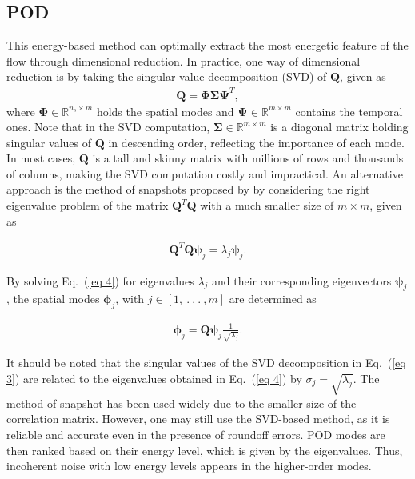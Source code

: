 \documentclass[a4paper,fleqn]{cas-sc}
\begin{document}
	\subsection{POD}
	\label{POD}
	
	This energy-based method can optimally extract the most energetic feature of the flow through dimensional reduction. In practice, one way of dimensional reduction is by taking the singular value decomposition (SVD) of $\mathbf{Q}$, given as
	\begin{align}
		\mathbf{Q} = \mathbf{\Phi} \mathbf{\Sigma} \mathbf{\Psi}^T ,\label{eq 3}
	\end{align}
	\noindent where $\mathbf{\Phi} \in \mathbb{R}^{n_s\times m}$ holds the spatial modes and $\mathbf{\Psi}\in \mathbb{R}^{m\times m}$ contains the temporal ones. Note that in the SVD computation, $\mathbf{\Sigma}\in \mathbb{R}^{m\times m}$ is a diagonal matrix holding singular values of $\mathbf{Q}$ in descending order, reflecting the importance of each mode. In most cases, $\mathbf{Q}$ is a tall and skinny matrix with millions of rows and thousands of columns, making the SVD computation costly and impractical. An alternative approach is the method of snapshots proposed by \citet{Sirovich1987} by considering the right eigenvalue problem of the matrix $\mathbf{Q}^T\mathbf{Q}$ with a much smaller size of $m\times m$, given as 
	
	\begin{align}
		\mathbf{Q}^T\mathbf{Q}\boldsymbol{\psi} _j = \lambda _j \boldsymbol{\psi} _j.\label{eq 4}
	\end{align}
	
	\noindent By solving Eq.~(\ref{eq 4}) for eigenvalues $\lambda _j$ and their corresponding eigenvectors $\boldsymbol{\psi} _j$, the spatial modes $\boldsymbol{\phi} _j$, with $j\in [1,~.~.~.~, m]$ are determined as
	
	\begin{align}
		\boldsymbol{\phi} _j = \mathbf{Q} \boldsymbol{\psi} _j \frac{1}{\sqrt{\lambda _j}}.\label{eq 5}
	\end{align}
	
	\noindent It should be noted that the singular values of the SVD decomposition in Eq.~(\ref{eq 3}) are related to the eigenvalues obtained in Eq.~(\ref{eq 4}) by $\sigma_j = \sqrt{\lambda_j}$. The method of snapshot has been used widely due to the smaller size of the correlation matrix. However, one may still use the SVD-based method, as it is reliable and accurate even in the presence of roundoff errors. POD modes are then ranked based on their energy level, which is given by the eigenvalues. Thus, incoherent noise with low energy levels appears in the higher-order modes.
	
\end{document}
